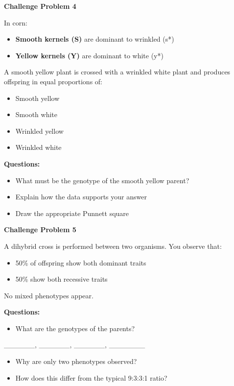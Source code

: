 \documentclass[
  letterpaper,
  DIV=11,
  numbers=noendperiod]{scrreprt}
\providecommand{\tightlist}{%
  \setlength{\itemsep}{0pt}\setlength{\parskip}{0pt}}
\begin{document}
\textbf{Challenge Problem 4}

In corn:

\begin{itemize}
\item
  \textbf{Smooth kernels (S)} are dominant to wrinkled (s*)
\item
  \textbf{Yellow kernels (Y)} are dominant to white (y*)
\end{itemize}

A smooth yellow plant is crossed with a wrinkled white plant and
produces offspring in equal proportions of:

\begin{itemize}
\item
  Smooth yellow
\item
  Smooth white
\item
  Wrinkled yellow
\item
  Wrinkled white
\end{itemize}

\textbf{Questions:}

\begin{itemize}
\item
  What must be the genotype of the smooth yellow parent?
\item
  Explain how the data supports your answer
\item
  Draw the appropriate Punnett square
\end{itemize}

\textbf{Challenge Problem 5}

A dihybrid cross is performed between two organisms. You observe that:

\begin{itemize}
\item
  50\% of offspring show both dominant traits
\item
  50\% show both recessive traits
\end{itemize}

No mixed phenotypes appear.

\textbf{Questions:}

\begin{itemize}
\tightlist
\item
  What are the genotypes of the parents?
\end{itemize}

\_\_\_\_\_\_, \_\_\_\_\_\_, \_\_\_\_\_\_, \_\_\_\_\_\_\_

\begin{itemize}
\item
  Why are only two phenotypes observed?
\item
  How does this differ from the typical 9:3:3:1 ratio?
\end{itemize}
\end{document}
